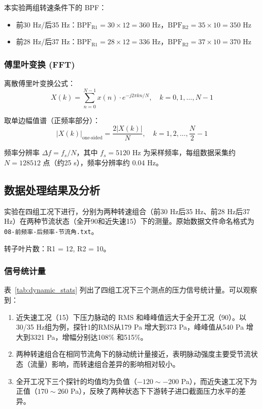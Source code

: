 本实验两组转速条件下的 BPF：
\begin{itemize}
    \item 前30 Hz/后35 Hz：$\text{BPF}_{\text{R1}} = 30 \times 12 = 360$ Hz，$\text{BPF}_{\text{R2}} = 35 \times 10 = 350$ Hz
    \item 前28 Hz/后37 Hz：$\text{BPF}_{\text{R1}} = 28 \times 12 = 336$ Hz，$\text{BPF}_{\text{R2}} = 37 \times 10 = 370$ Hz
\end{itemize}

\subsubsection{傅里叶变换 (FFT)}

离散傅里叶变换公式：
\begin{equation}
    X(k) = \sum_{n=0}^{N-1} x(n) \cdot e^{-j2\pi k n / N}, \quad k = 0, 1, \dots, N-1
\end{equation}

取单边幅值谱（正频率部分）：
\begin{equation}
    |X(k)|_{\text{one-sided}} = \frac{2|X(k)|}{N}, \quad k = 1, 2, \dots, \frac{N}{2}-1
\end{equation}

频率分辨率 $\Delta f = f_s / N$，其中 $f_s = 5120$ Hz 为采样频率，每组数据采集约 $N = 128512$ 点（约25 s），频率分辨率约 0.04 Hz。

\subsection{数据处理结果及分析}

实验在四组工况下进行，分别为两种转速组合（前30 Hz后35 Hz、前28 Hz后37 Hz）在两种节流状态（全开90\textdegree{}和近失速15\textdegree{}）下的测量。原始数据文件命名格式为 \texttt{08-前频率-后频率-节流角.txt}。

转子叶片数：R1 = 12, R2 = 10。

\subsubsection{信号统计量}



表~\ref{tab:dynamic_stats} 列出了四组工况下三个测点的压力信号统计量。可以观察到：
\begin{enumerate}
    \item 近失速工况（15\textdegree{}）下压力脉动的 RMS 和峰峰值远大于全开工况（90\textdegree{}）。以30/35 Hz组为例，探针1的RMS从179 Pa 增大到373 Pa，峰峰值从540 Pa 增大到3321 Pa，增幅分别达108\% 和515\%。
    \item 两种转速组合在相同节流角下的脉动统计量接近，表明脉动强度主要受节流状态（流量）影响，而转速组合差异的影响相对较小。
    \item 全开工况下三个探针的均值均为负值（$-120\sim-200$ Pa），而近失速工况下为正值（$170\sim260$ Pa），反映了两种状态下下游转子进口截面压力水平的差异。
\end{enumerate}

